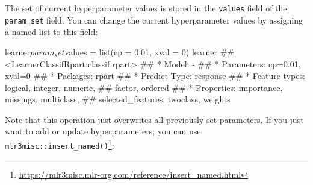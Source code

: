 \documentclass[12pt,]{scrbook}
\newenvironment{Shaded}{}{}
\newcommand{\DataTypeTok}[1]{#1}
\newcommand{\DecValTok}[1]{#1}
\newcommand{\FloatTok}[1]{#1}
\newcommand{\KeywordTok}[1]{\textcolor[rgb]{0.00,0.00,1.00}{#1}}
\newcommand{\NormalTok}[1]{#1}
\newcommand{\OperatorTok}[1]{#1}
\newcommand{\StringTok}[1]{\textcolor[rgb]{0.00,0.50,0.50}{#1}}
\renewcommand{\href}[2]{#2\footnote{\url{#1}}}
\begin{document}
\begin{Shaded}
\end{Shaded}

The set of current hyperparameter values is stored in the \texttt{values} field of the \texttt{param\_set} field.
You can change the current hyperparameter values by assigning a named list to this field:

\begin{Shaded}
\begin{Highlighting}[]
\NormalTok{learner}\OperatorTok{$}\NormalTok{param_set}\OperatorTok{$}\NormalTok{values =}\StringTok{ }\KeywordTok{list}\NormalTok{(}\DataTypeTok{cp =} \FloatTok{0.01}\NormalTok{, }\DataTypeTok{xval =} \DecValTok{0}\NormalTok{)}
\NormalTok{learner}
\NormalTok{## <LearnerClassifRpart:classif.rpart>}
\NormalTok{## * Model: -}
\NormalTok{## * Parameters: cp=0.01, xval=0}
\NormalTok{## * Packages: rpart}
\NormalTok{## * Predict Type: response}
\NormalTok{## * Feature types: logical, integer, numeric,}
\NormalTok{##   factor, ordered}
\NormalTok{## * Properties: importance, missings, multiclass,}
\NormalTok{##   selected_features, twoclass, weights}
\end{Highlighting}
\end{Shaded}

Note that this operation just overwrites all previously set parameters.
If you just want to add or update hyperparameters, you can use \href{https://mlr3misc.mlr-org.com/reference/insert_named.html}{\texttt{mlr3misc::insert\_named()}}:
\end{document}
